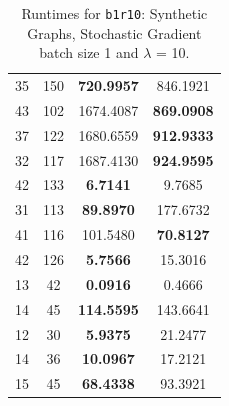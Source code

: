 \documentclass{article}
\begin{document}
\begin{table}[h]
\begin{tabular}{lccc}
35 & 150 & \textbf{720.9957} & 846.1921 \\
43 & 102 & 1674.4087 & \textbf{869.0908} \\
37 & 122 & 1680.6559 & \textbf{912.9333} \\
32 & 117 & 1687.4130 & \textbf{924.9595} \\
42 & 133 & \textbf{6.7141} & 9.7685 \\
31 & 113 & \textbf{89.8970} & 177.6732 \\
41 & 116 & 101.5480 & \textbf{70.8127} \\
42 & 126 & \textbf{5.7566} & 15.3016 \\
13 & 42 & \textbf{0.0916} & 0.4666 \\
14 & 45 & \textbf{114.5595} & 143.6641 \\
12 & 30 & \textbf{5.9375} & 21.2477 \\
14 & 36 & \textbf{10.0967} & 17.2121 \\
15 & 45 & \textbf{68.4338} & 93.3921 \\
\bottomrule
\end{tabular}
\caption{Runtimes for \texttt{b1r10}: Synthetic Graphs, Stochastic Gradient batch size 1 and $\lambda$ = 10.}
\end{table}
\end{document}
